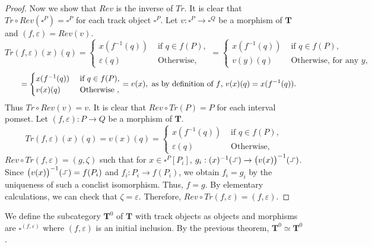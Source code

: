 \documentclass[11pt,a4paper,oldfontcommands]{memoir}
\newcommand*{\intpom}{\TrO}
\newcommand{\TrO}{\mathbf{T}}
\newcommand*\exec{%
  \raisebox{1pt}{%
    \begin{tikzpicture}[x=.8ex,y=1ex,-]
      \draw (0,0) -- (1,0) -- (1,1) -- (2,1);
    \end{tikzpicture}}}
\begin{document}
\begin{proof}
Now we show that $Rev$ is the inverse of  $Tr$. It is clear that $Tr\circ Rev(\square^P)=\square^P$ for each track object $\square^P.$ Let $v: \square^P \to \square^Q$ be a morphism of $\TrO$ and $(f,\varepsilon)=Rev(v).$ %
\begin{equation*} %
     Tr(f,\varepsilon)(x)(q)
     = \begin{cases} x(f^{-1}(q)) & \text { if } q \in f(P), \\ \varepsilon(q) & \text { Otherwise}, \end{cases}
      = \begin{cases} x(f^{-1}(q)) & \text { if } q \in f(P), \\ v(y)(q) & \text { Otherwise, for any }y, \end{cases}
    \end{equation*}
\begin{equation*}
  \hspace{.7cm}   = \begin{cases} x(f^{-1}(q)) & \text { if } q \in f(P), \\ v(x)(q) & \text { Otherwise }, \end{cases}
    = v(x),  \text{ as by definition of $f$, $v(x)(q)=x(f^{-1}(q))$.}   \hspace{.3cm}
\end{equation*}
Thus $Tr\circ Rev(v)=v.$ It is clear that $Rev \circ Tr(P)=P$ for each interval pomset. Let $(f,\varepsilon): P \to Q$ be a morphism of $\intpom$.
\begin{equation*} %
     Tr(f,\varepsilon)(x)(q)=
    v(x)(q) = \begin{cases} x(f^{-1}(q)) & \text { if } q \in f(P), \\ \varepsilon(q) & \text { Otherwise}, \end{cases}
    \end{equation*}
  $ Rev \circ Tr (f,\varepsilon)=(g,\zeta)$ such that for $x\in \square^P[P_i]$, $g_i: (x)^{-1}(\exec) \to \bigl(v(x)\bigl)^{-1}(\exec)$. Since $\bigl(v(x)\bigl)^{-1}(\exec)=f(P_i)$ and $f_i: P_i \to f(P_i)$, we obtain $f_i=g_i$ by the uniqueness of such a conclist isomorphism. Thus, $f=g$. By elementary calculations, we can check that $\zeta=\varepsilon$. Therefore, $Rev \circ Tr (f,\varepsilon)=(f,\varepsilon)$.
\end{proof}
We define the subcategory $\TrO^0$ of $\TrO$ with track objects as objects and morphisms are $\square^{(f,\varepsilon)}$ where $(f,\varepsilon)$ is an initial inclusion. By the previous theorem, $\TrO^0 \simeq \intpom^0$.
\end{document}
